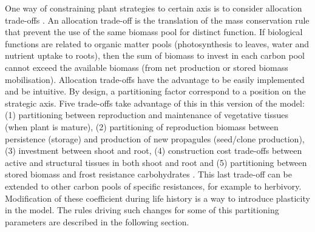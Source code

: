 One way of constraining plant strategies to certain axis is to consider allocation trade-offs \cite{kleidon_global_2000, reineking_environmental_2006}. An allocation trade-off is the translation of the mass conservation rule that prevent the use of the same biomass pool for distinct function. If biological functions are related to organic matter pools (photosynthesis to leaves, water and nutrient uptake to roots), then the sum of biomass to invest in each carbon pool cannot exceed the available biomass (from net production or stored biomass mobilisation). Allocation trade-offs have the advantage to be easily implemented and be intuitive. By design, a partitioning factor correspond to a position on the strategic axis. Five trade-offs take advantage of this in this version of the model: (1) partitioning between reproduction and maintenance of vegetative tissues (when plant is mature), (2) partitioning of reproduction biomass between persistence (storage) and production of new propagules (seed/clone production)\cite{reineking_environmental_2006}, (3) investment between shoot and root, \cite{kleidon_global_2000, reineking_environmental_2006, taubert_modelling_2014}(4) construction cost trade-offs between active and structural tissues in both shoot and root and (5) partitioning between stored biomass and frost resistance carbohydrates \cite{cai_changes_2004}. This last trade-off can be extended to other carbon pools of specific resistances, for example to herbivory. Modification of these coefficient during life history is a way to introduce plasticity in the model. The rules driving such changes for some of this partitioning parameters are described in the following section.\\


